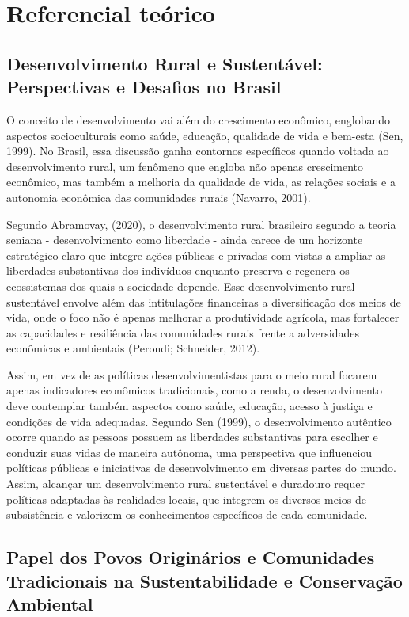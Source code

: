 \pagestyle{plain}


\chapter{Referencial teórico}


\section{Desenvolvimento Rural e Sustentável: Perspectivas e Desafios no Brasil}


O conceito de desenvolvimento vai além do crescimento econômico, englobando aspectos socioculturais como saúde, educação, qualidade de vida e bem-esta (Sen, 1999). No Brasil, essa discussão ganha contornos específicos quando voltada ao desenvolvimento rural, um fenômeno que engloba não apenas crescimento econômico, mas também a melhoria da qualidade de vida, as relações sociais e a autonomia econômica das comunidades rurais (Navarro, 2001). 

Segundo Abramovay, (2020), o desenvolvimento rural brasileiro segundo a teoria seniana - desenvolvimento como liberdade - ainda carece de um horizonte estratégico claro que integre ações públicas e privadas com vistas a ampliar as liberdades substantivas dos indivíduos enquanto preserva e regenera os ecossistemas dos quais a sociedade depende. Esse desenvolvimento rural sustentável envolve além das intitulações financeiras  a diversificação dos meios de vida, onde o foco não é apenas melhorar a produtividade agrícola, mas fortalecer as capacidades e resiliência das comunidades rurais frente a adversidades econômicas e ambientais (Perondi; Schneider, 2012). 

Assim, em vez de as políticas desenvolvimentistas para o meio rural focarem apenas indicadores econômicos tradicionais, como a renda, o desenvolvimento deve contemplar também aspectos como saúde, educação, acesso à justiça e condições de vida adequadas. Segundo Sen (1999), o desenvolvimento autêntico ocorre quando as pessoas possuem as liberdades substantivas para escolher e conduzir suas vidas de maneira autônoma, uma perspectiva que influenciou políticas públicas e iniciativas de desenvolvimento em diversas partes do mundo. Assim, alcançar um desenvolvimento rural sustentável e duradouro requer políticas adaptadas às realidades locais, que integrem os diversos meios de subsistência e valorizem os conhecimentos específicos de cada comunidade.


\section{Papel dos Povos Originários e Comunidades Tradicionais na Sustentabilidade e Conservação Ambiental}

